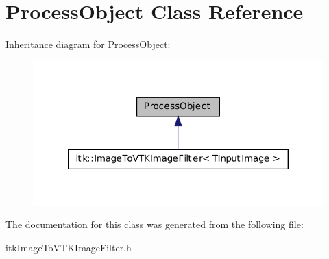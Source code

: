 \hypertarget{class_process_object}{
\section{ProcessObject Class Reference}
\label{class_process_object}
}


Inheritance diagram for ProcessObject:\nopagebreak
\begin{figure}[H]
\begin{center}
\leavevmode
\includegraphics[width=322pt]{class_process_object__inherit__graph}
\end{center}
\end{figure}


The documentation for this class was generated from the following file:\begin{DoxyCompactItemize}
\item 
itkImageToVTKImageFilter.h\end{DoxyCompactItemize}
